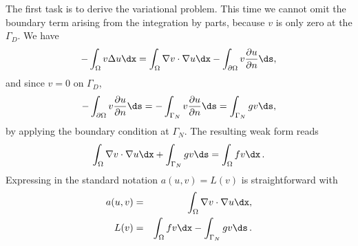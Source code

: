 The first task is to derive the variational problem. This time we cannot
omit the boundary term arising from the integration by parts, because
$v$ is only zero at the $\Gamma_D$. We have
\[
 -\int_\Omega v\Delta u \dx
= \int_\Omega\nabla v\cdot\nabla u\dx - \int_{\partial\Omega}v{\partial u\over
\partial n}\ds,
\]
and since $v=0$ on $\Gamma_D$,
\[
- \int_{\partial\Omega}v{\partial u\over
\partial n}\ds
=
- \int_{\Gamma_N}v{\partial u\over
\partial n}\ds
= \int_{\Gamma_N}gv\ds,
\]
by applying the boundary condition at $\Gamma_N$.
The resulting weak form reads
\begin{equation}
\int_{\Omega} \nabla v \cdot \nabla u \dx +
\int_{\Gamma_N} g v\ds
= \int_{\Omega} fv \dx\langtangenep
\label{langtangen:poisson:2D:DN:weak}
\end{equation}
Expressing 
in the standard notation $a(u,v)=L(v)$ is straightforward with
\begin{eqnarray}
a(u, v) &=& \int_{\Omega} \nabla v \cdot \nabla u \dx,
\label{langtangen:poisson2:vard:a}\\
L(v) &=& \int_{\Omega} fv \dx -
\int_{\Gamma_N} g v\ds\langtangenep\label{langtangen:poisson2:vard:L}
\end{eqnarray}

